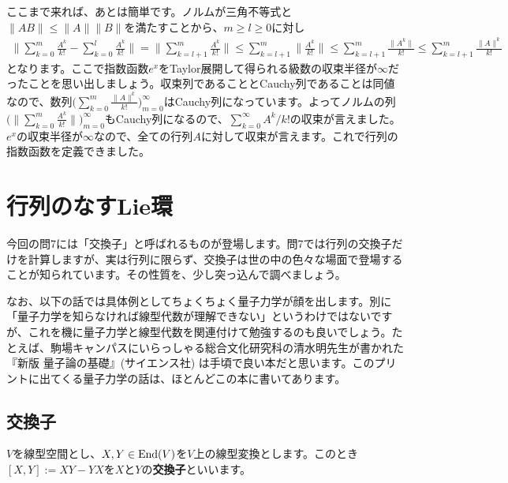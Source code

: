 ここまで来れば、あとは簡単です。ノルムが三角不等式と$\|AB\| \leq \|A\| \|B\|$を満たすことから、$m \geq l \geq 0$に対し
\begin{align*}
\Biggl\|\sum_{k = 0}^m \frac{A^k}{k!} - \sum_{k = 0}^l \frac{A^k}{k!} \Biggr\|
= \Biggl\|\sum_{k = l + 1}^m \frac{A^k}{k!} \Biggr\|
\leq \sum_{k = l + 1}^m \biggl\|\frac{A^k}{k!} \biggr\|
\leq \sum_{k = l + 1}^m \frac{\|A^k\|}{k!}
\leq \sum_{k = l + 1}^m \frac{\|A\|^k}{k!}
\end{align*}
となります。ここで指数函数$e^x$をTaylor展開して得られる級数の収束半径が$\infty$だったことを思い出しましょう。収束列であることとCauchy列であることは同値なので、数列$\bigl(\sum_{k = 0}^m \frac{\|A\|^k}{k!}\bigr)_{m = 0}^{\infty}$はCauchy列になっています。よってノルムの列$\bigl(\|\sum_{k = 0}^m \frac{A^k}{k!}\|\bigr)_{m = 0}^{\infty}$もCauchy列になるので、$\sum_{k = 0}^{\infty} A^k / k!$の収束が言えました。$e^x$の収束半径が$\infty$なので、全ての行列$A$に対して収束が言えます。これで行列の指数函数を定義できました。

\section{行列のなすLie環}

今回の問7には「交換子」と呼ばれるものが登場します。問7では行列の交換子だけを計算しますが、実は行列に限らず、交換子は世の中の色々な場面で登場することが知られています。その性質を、少し突っ込んで調べましょう。

なお、以下の話では具体例としてちょくちょく量子力学が顔を出します。別に「量子力学を知らなければ線型代数が理解できない」というわけではないですが、これを機に量子力学と線型代数を関連付けて勉強するのも良いでしょう。たとえば、駒場キャンパスにいらっしゃる総合文化研究科の清水明先生が書かれた『新版 量子論の基礎』(サイエンス社) は手頃で良い本だと思います。このプリントに出てくる量子力学の話は、ほとんどこの本に書いてあります。

\subsection{交換子}

$V$を線型空間とし、$X, Y \in \operatorname{End}(V)$を$V$上の線型変換とします。このとき$[X, Y] := XY - YX$を$X$と$Y$の\textbf{交換子}といいます。

